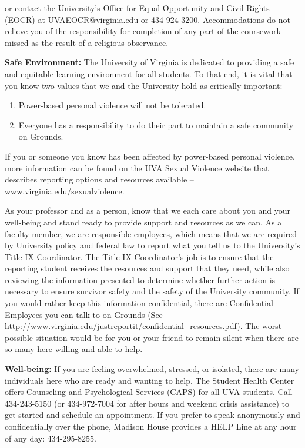\documentclass[12pt]{article}
\begin{document}
or contact the University's Office for Equal Opportunity and Civil Rights (EOCR) at \url{UVAEOCR@virginia.edu} or 434-924-3200.  Accommodations do not relieve you of the responsibility for completion of any part of the coursework missed as the result of a religious observance.

\textbf{Safe Environment:} The University of Virginia is dedicated to providing a safe and equitable learning environment for all students. To that end, it is vital that you know two values that we and the University hold as critically important:
 
\begin{enumerate}
    \item Power-based personal violence will not be tolerated. 
    \item Everyone has a responsibility to do their part to maintain a safe community on Grounds.
\end{enumerate}

If you or someone you know has been affected by power-based personal violence, more information can be found on the UVA Sexual Violence website that describes reporting options and resources available -- \url{www.virginia.edu/sexualviolence}. 
   
As your professor and as a person, know that we each care about you and your well-being and stand ready to provide support and resources as we can. As a faculty member, we are responsible employees, which means that we are required by University policy and federal law to report what you tell us to the University's Title IX Coordinator. The Title IX Coordinator's job is to ensure that the reporting student receives the resources and support that they need, while also reviewing the information presented to determine whether further action is necessary to ensure survivor safety and the safety of the University community. If you would rather keep this information confidential, there are Confidential Employees you can talk to on Grounds (See \url{http://www.virginia.edu/justreportit/confidential\_resources.pdf}). The worst possible situation would be for you or your friend to remain silent when there are so many here willing and able to help.

\textbf{Well-being:} If you are feeling overwhelmed, stressed, or isolated, there are many individuals here who are ready and wanting to help. The Student Health Center offers Counseling and Psychological Services (CAPS) for all UVA students. Call 434-243-5150 (or 434-972-7004 for after hours and weekend crisis assistance) to get started and schedule an appointment. If you prefer to speak anonymously and confidentially over the phone, Madison House provides a HELP Line at any hour of any day: 434-295-8255.
\end{document}
